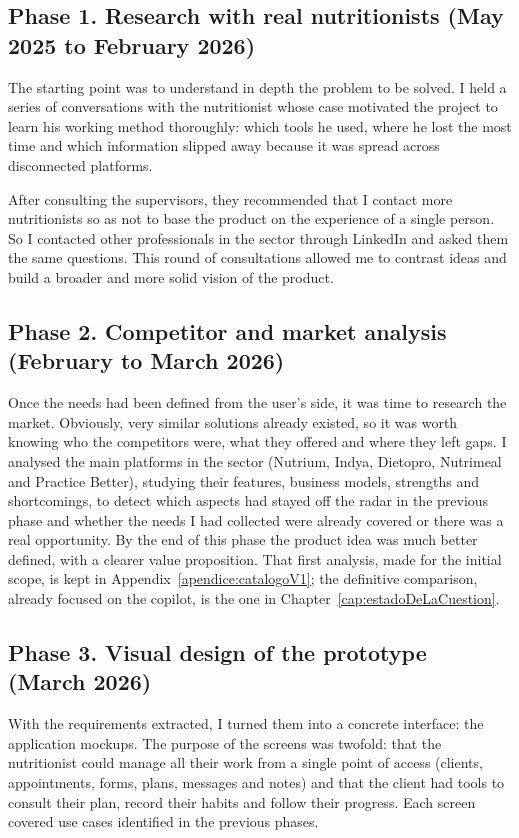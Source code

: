 \subsection*{Phase 1. Research with real nutritionists (May 2025 to February 2026)}

The starting point was to understand in depth the problem to be solved. I held a series of conversations with the nutritionist whose case motivated the project to learn his working method thoroughly: which tools he used, where he lost the most time and which information slipped away because it was spread across disconnected platforms.

After consulting the supervisors, they recommended that I contact more nutritionists so as not to base the product on the experience of a single person. So I contacted other professionals in the sector through LinkedIn and asked them the same questions. This round of consultations allowed me to contrast ideas and build a broader and more solid vision of the product.

\subsection*{Phase 2. Competitor and market analysis (February to March 2026)}

Once the needs had been defined from the user's side, it was time to research the market. Obviously, very similar solutions already existed, so it was worth knowing who the competitors were, what they offered and where they left gaps. I analysed the main platforms in the sector (Nutrium, Indya, Dietopro, Nutrimeal and Practice Better), studying their features, business models, strengths and shortcomings, to detect which aspects had stayed off the radar in the previous phase and whether the needs I had collected were already covered or there was a real opportunity. By the end of this phase the product idea was much better defined, with a clearer value proposition. That first analysis, made for the initial scope, is kept in Appendix~\ref{apendice:catalogoV1}; the definitive comparison, already focused on the copilot, is the one in Chapter~\ref{cap:estadoDeLaCuestion}.

\subsection*{Phase 3. Visual design of the prototype (March 2026)}

With the requirements extracted, I turned them into a concrete interface: the application mockups. The purpose of the screens was twofold: that the nutritionist could manage all their work from a single point of access (clients, appointments, forms, plans, messages and notes) and that the client had tools to consult their plan, record their habits and follow their progress. Each screen covered use cases identified in the previous phases.

